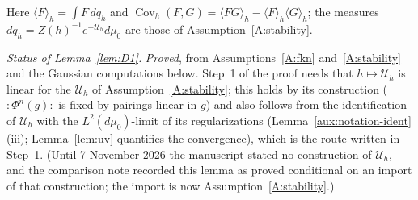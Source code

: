 \documentclass[11pt,a4paper]{article}
\theoremstyle{plain}
\theoremstyle{definition}
\theoremstyle{plain}
\theoremstyle{definition}
\DeclareMathOperator{\Cov}{Cov}
\newcommand{\ev}[2]{\langle #1\rangle_{#2}}            %
\newcommand{\Uc}{\mathcal U}
\newcommand{\dmu}{d\mu_0}
\begin{document}
Here $\ev{F}{h}=\int F\,dq_h$ and $\Cov_h(F,G)=\ev{FG}{h}-\ev{F}{h}\ev{G}{h}$; the measures
$dq_h=Z(h)^{-1}e^{-\Uc_h}\dmu$ are those of Assumption~\ref{A:stability}.

\emph{Status of Lemma~\ref{lem:D1}.}  \emph{Proved}, from Assumptions~\ref{A:fkn}
and~\ref{A:stability} and the Gaussian computations below.  Step~1 of the proof needs that
$h\mapsto\Uc_h$ is linear for the $\Uc_h$ of Assumption~\ref{A:stability}; this holds by its
construction (${:}\Phi^n(g){:}$ is fixed by pairings linear in $g$) and also follows from
the identification of $\Uc_h$ with the $L^2(\dmu)$-limit of its regularizations
(Lemma~\ref{aux:notation-ident}(iii); Lemma~\ref{lem:uv} quantifies the convergence), which
is the route written in Step~1.  (Until 7 November 2026 the manuscript stated no
construction of $\Uc_h$, and the comparison note recorded this lemma as proved conditional
on an import of that construction; the import is now Assumption~\ref{A:stability}.)
\end{document}
